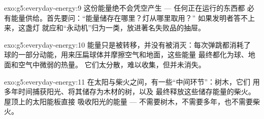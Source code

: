 \begin{solution}{exo:g5:everyday-energy:9}
这份能量绝不会凭空产生 --- 任何正在运行的东西都
必有能量供给。首先要问：“能量储存在哪里？灯从哪里取用？”
如果发明者答不上来，这盏灯
就应和“永动机”归为一类，放进著名失败品的抽屉。
\end{solution}

\begin{solution}{exo:g5:everyday-energy:10}
能量只是被转移，并没有被消灭：每次弹跳都消耗了
球的一部分动能，用来压扁球体并摩擦空气和地面，这些能量
最终都化为球、地面和空气中微弱的热量。
它们太分散，难以收集，但并未消失。
\end{solution}

\begin{solution}{exo:g5:everyday-energy:11}
在太阳与柴火之间，有一些“中间环节”：树木，它们
用多年时间捕获阳光、将其储存为木材的树，以及
最终释放这些储存能量的柴火。屋顶上的太阳能板直接
吸收阳光的能量 --- 不需要树木，不需要多年，也不需要柴火。
\end{solution}
